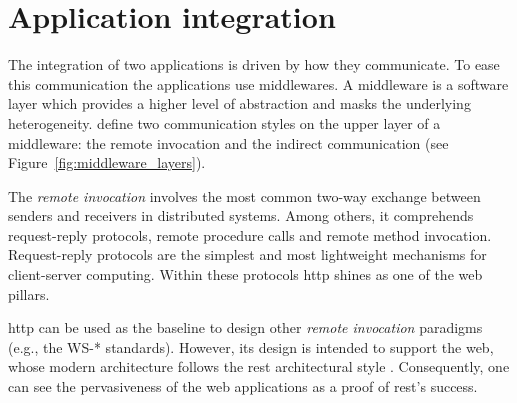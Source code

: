 \section{Application integration}
\label{sec:soa_integration}

%
%


The integration of two applications is driven by how they communicate.
To ease this communication the applications use middlewares.
A middleware is a software layer which provides a higher level of abstraction and masks the underlying heterogeneity.
\citet{coulouris_distributed_2012} define two communication styles on the upper layer of a middleware: %
the remote invocation and the indirect communication (see Figure~\ref{fig:middleware_layers}).



\medskip

The \emph{remote invocation} involves the most common two-way exchange between senders and receivers in distributed systems.
Among others, it comprehends request-reply protocols, remote procedure calls and remote method invocation.
Request-reply protocols are the simplest and most lightweight mechanisms for client-server computing. %
Within these protocols \ac{http} shines as one of the web pillars.


\ac{http} can be used as the baseline to design other \emph{remote invocation} paradigms (e.g., the WS-* \citep{alonso_web_2010} standards).
However, its design is intended to support the web, whose modern architecture follows the \ac{rest} architectural style \citep{fielding_architectural_2000}.
Consequently, one can see the pervasiveness of the web applications as a proof of \ac{rest}'s success.

